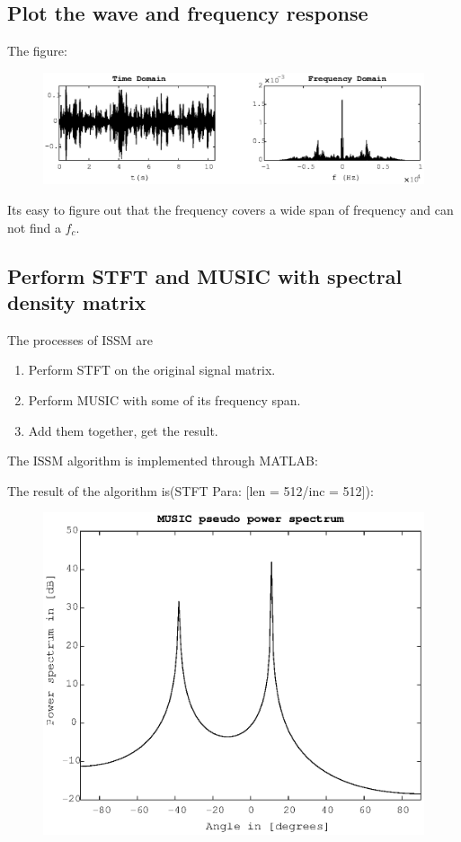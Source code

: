 \documentclass[UTF8]{article}
\begin{document}
\subsection{Plot the wave and frequency response}
The figure:
\begin{figure}[H]
    \centering 
    \includegraphics[scale=0.7]{img/fig03.eps}\\
\end{figure}
Its easy to figure out that the frequency covers a wide span of frequency and can not find a $f_c$.

\subsection{Perform STFT and MUSIC with spectral density matrix}
\hspace{0.5em} The processes of ISSM are
\begin{enumerate}
    \item Perform STFT on the original signal matrix.
    \item Perform MUSIC with some of its frequency span.
    \item Add them together, get the result.
\end{enumerate}

The ISSM algorithm is implemented through MATLAB:



The result of the algorithm is(STFT Para: [len = 512/inc = 512]):

\begin{figure}[H]
    \centering
    \includegraphics[scale=0.7]{img/fig04.eps} \\
\end{figure}
\end{document}
